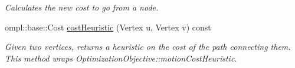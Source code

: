 \begin{DoxyCompactItemize}
\begin{DoxyCompactList}\small\item\em \-Calculates the new cost to go from a node. \end{DoxyCompactList}\item 
\hypertarget{class_f_i_r_m_a18aa9a3e98fd03d5654ffd3ebc7ca9ff}{ompl\-::base\-::\-Cost \hyperlink{class_f_i_r_m_a18aa9a3e98fd03d5654ffd3ebc7ca9ff}{cost\-Heuristic} (\-Vertex u, \-Vertex v) const }\label{class_f_i_r_m_a18aa9a3e98fd03d5654ffd3ebc7ca9ff}

\begin{DoxyCompactList}\small\item\em \-Given two vertices, returns a heuristic on the cost of the path connecting them. \-This method wraps \-Optimization\-Objective\-::motion\-Cost\-Heuristic. \end{DoxyCompactList}\end{DoxyCompactItemize}
